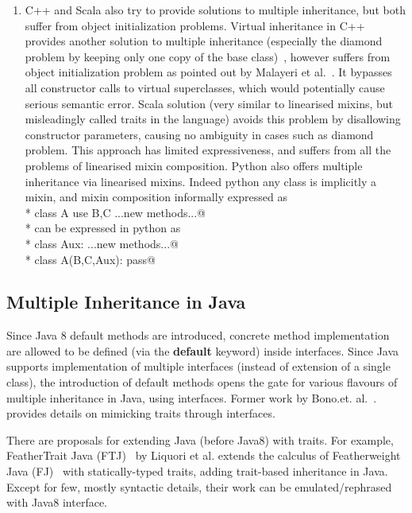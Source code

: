 \begin{enumerate}
\item C++ and Scala also try to provide solutions to multiple inheritance, but
  both suffer from object initialization problems. Virtual inheritance in C++
  provides another solution to multiple inheritance (especially the diamond
  problem by keeping only one copy of the base class)~\cite{ellis1990annotated},
  however suffers from object initialization problem as pointed out by Malayeri
  et al.~\cite{malayeri2009cz}. It bypasses all constructor calls to virtual
  superclasses, which would potentially cause serious semantic error. Scala
  solution (very similar to linearised mixins, but misleadingly called traits in
  the language) avoids this problem by disallowing constructor parameters,
  causing no ambiguity in cases such as diamond problem.  This approach has
  limited expressiveness, and suffers from all the problems of linearised mixin
  composition.
  Python also offers multiple inheritance via linearised mixins. Indeed python any class is implicitly a mixin, and mixin composition informally expressed as\\*
  \Q@ class A use B,C {...new methods...}@\\*
  can be expressed in python as \\*
  \Q@ class Aux: ...new methods...@\\*
  \Q@ class A(B,C,Aux): pass@
\end{enumerate}

\subsection{Multiple Inheritance in Java}
Since Java 8 default methods are introduced, concrete method implementation are
allowed to be defined (via the \textbf{default} keyword) inside
interfaces. Since Java supports implementation of multiple interfaces (instead
of extension of a single class), the introduction of default methods opens the
gate for various flavours of multiple inheritance in Java, using interfaces.
Former work by Bono.et. al.~\cite{bono14}. provides details on mimicking traits
through interfaces.

There are proposals for extending Java (before Java8) with traits. For example,
FeatherTrait Java (FTJ)~\cite{Liquori08ftj} by Liquori et al. extends the
calculus of Featherweight Java (FJ)~\cite{Igarashi01FJ} with statically-typed
traits, adding trait-based inheritance in Java.  Except for few, mostly
syntactic details, their work can be emulated/rephrased with Java8 interface.


